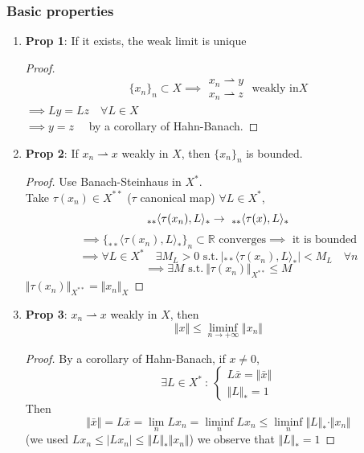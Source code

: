 \subsubsection{Basic properties}
\begin{enumerate}
    \item \textbf{Prop 1}: If it exists, the weak limit is unique
    \begin{proof}
        $$\{x_n\}_n\subset X \implies \substack{x_n\rightharpoonup y\\ x_n\rightharpoonup z}\text{ weakly in} X$$
        $\implies Ly=Lz\quad \forall L\in X$\\
        $\implies y=z \quad$ by a corollary of Hahn-Banach.
    \end{proof}
    \item \textbf{Prop 2}: If $x_n\rightharpoonup x$ weakly in $X$, then $\{x_n\}_n$ is bounded.
    \begin{proof}
    Use Banach-Steinhaus in $X^*$.\\
    Take $\tau (x_n)\in X^{**}$ ($\tau$ canonical map)
    $\forall L\in X^*$,
    $$\\ _{**}\langle\tau (x_n), L\rangle_*\to \ _{**}\langle \tau (x),L\rangle_*$$
    $$\implies \{_{**}\langle\tau (x_n), L\rangle_*\}_n\subset \mathbb R\text{ converges}\implies \text{ it is bounded}$$
    $$\implies \forall L\in X^*\quad \exists M_L>0 \text{ s.t.} \ |_{**}\langle \tau (x_n),L\rangle_*|<M_L\quad \forall n$$
    $$\implies \exists M \text{ s.t.} \ \Vert \tau (x_n)\Vert_{X^{**}}\leq M$$
    $\Vert \tau (x_n)\Vert_{X^{**}}=\Vert x_n\Vert_X$
    
        
    \end{proof}
    \item \textbf{Prop 3}: $x_n\rightharpoonup x$ weakly in $X$, then 
    $$\Vert x\Vert \leq \liminf_{n\to +\infty} \Vert x_n\Vert$$
    \begin{proof}
        By a corollary of Hahn-Banach, if $x\neq 0$,
        $$\exists L\in X^* \ :\ \begin{cases}
            L\bar x=\Vert \bar x\Vert \\
            \Vert L\Vert_*=1
        \end{cases}$$
        Then $$\Vert \bar x\Vert =L\bar x=\lim_n Lx_n = \liminf_{n} Lx_n\leq \liminf_n \Vert L\Vert_*\cdot \Vert x_n\Vert $$
        (we used $Lx_n\leq |Lx_n|\leq \Vert L\Vert_*\Vert x_n\Vert$)
        we observe that $\Vert L\Vert_*=1$
    \end{proof}

\end{enumerate}
